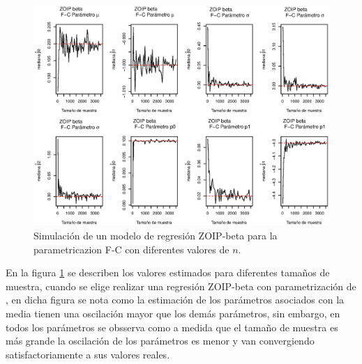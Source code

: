 \begin{figure}
	\begin{center}
		\includegraphics[scale=0.5]{Converg_FC.eps}	
		\caption{Simulaci\'{o}n de un modelo de regresi\'{o}n ZOIP-beta para la parametricazion F-C con diferentes valores de $n$.}
		\label{Simu_FC}
	\end{center}
\end{figure}

En la figura \ref{Simu_FC} se describen los valores estimados para diferentes tama\~{n}os de muestra, cuando se elige realizar una regresi\'{o}n ZOIP-beta con parametrizaci\'{o}n de \cite{Ferrari2}, en dicha figura se nota como la estimaci\'{o}n de los par\'{a}metros asociados con la media tienen una oscilaci\'{o}n mayor que los dem\'{a}s par\'{a}metros, sin embargo, en todos los par\'{a}metros se obsserva como a medida que el tama\~{n}o de muestra es m\'{a}s grande la oscilaci\'{o}n de los par\'{a}metros es menor y van convergiendo satisfactoriamente a sus valores reales.\\


